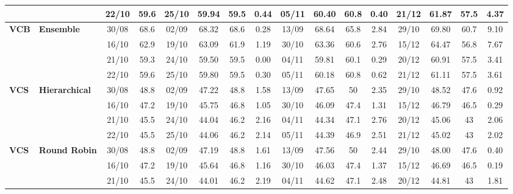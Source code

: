 \begin{table}[!h]
\begin{tabular}{llcc|cccc|cccc|cccc}
&
& 22/10 & 59.6 & 25/10 & 59.94 & 59.5 & 0.44 & 05/11 & 60.40 & 60.8 & 0.40 & 21/12 & 61.87 & 57.5 & 4.37 \\
\midrule

\multirow{4}{*}{\textbf{VCB}} 
& \textbf{Ensemble}
& 30/08 & 68.6 & 02/09 & 68.32 & 68.6 & 0.28 & 13/09 & 68.64 & 65.8 & 2.84 & 29/10 & 69.80 & 60.7 & 9.10 \\

&
& 16/10 & 62.9 & 19/10 & 63.09 & 61.9 & 1.19 & 30/10 & 63.36 & 60.6 & 2.76 & 15/12 & 64.47 & 56.8 & 7.67 \\

&
& 21/10 & 59.3 & 24/10 & 59.50 & 59.5 & 0.00 & 04/11 & 59.81 & 60.1 & 0.29 & 20/12 & 60.91 & 57.5 & 3.41 \\

&
& 22/10 & 59.6 & 25/10 & 59.80 & 59.5 & 0.30 & 05/11 & 60.18 & 60.8 & 0.62 & 21/12 & 61.11 & 57.5 & 3.61 \\
\midrule



\multirow{4}{*}{\textbf{VCS}} 
& \textbf{Hierarchical}
& 30/08 & 48.8 & 02/09 & 47.22 & 48.8 & 1.58 & 13/09 & 47.65 & 50 & 2.35 & 29/10 & 48.52 & 47.6 & 0.92 \\

&
& 16/10 & 47.2 & 19/10 & 45.75 & 46.8 & 1.05 & 30/10 & 46.09 & 47.4 & 1.31 & 15/12 & 46.79 & 46.5 & 0.29 \\

&
& 21/10 & 45.5 & 24/10 & 44.04 & 46.2 & 2.16 & 04/11 & 44.34 & 47.1 & 2.76 & 20/12 & 45.06 & 43 & 2.06 \\

&
& 22/10 & 45.5 & 25/10 & 44.06 & 46.2 & 2.14 & 05/11 & 44.39 & 46.9 & 2.51 & 21/12 & 45.02 & 43 & 2.02 \\
\midrule


\multirow{4}{*}{\textbf{VCS}} 
& \textbf{Round Robin}
& 30/08 & 48.8 & 02/09 & 47.19 & 48.8 & 1.61 & 13/09 & 47.56 & 50 & 2.44 & 29/10 & 48.00 & 47.6 & 0.40 \\

&
& 16/10 & 47.2 & 19/10 & 45.64 & 46.8 & 1.16 & 30/10 & 46.03 & 47.4 & 1.37 & 15/12 & 46.69 & 46.5 & 0.19 \\

&
& 21/10 & 45.5 & 24/10 & 44.01 & 46.2 & 2.19 & 04/11 & 44.62 & 47.1 & 2.48 & 20/12 & 44.81 & 43 & 1.81 \\


\end{tabular}
\end{table}
